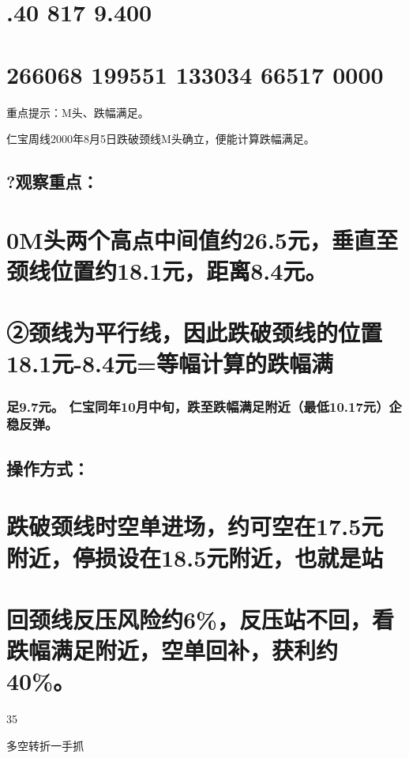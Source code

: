 \documentclass{article}
\begin{document}
\section{.40 817 9.400}

\section{266068 199551 133034 66517 0000}

重点提示：M头、跌幅满足。

仁宝周线2000年8月5日跌破颈线M头确立，便能计算跌幅满足。

\subsection{?观察重点：}

\section{0M头两个高点中间值约26.5元，垂直至颈线位置约18.1元，距离8.4元。}

\section{②颈线为平行线，因此跌破颈线的位置18.1元-8.4元=等幅计算的跌幅满}

\subsubsection{足9.7元。 仁宝同年10月中旬，跌至跌幅满足附近（最低10.17元）企稳反弹。}

\subsection{操作方式：}

\section{跌破颈线时空单进场，约可空在17.5元附近，停损设在18.5元附近，也就是站}

\section{回颈线反压风险约6\%，反压站不回，看跌幅满足附近，空单回补，获利约40\%。}

35

\clearpage

多空转折一手抓
\end{document}
